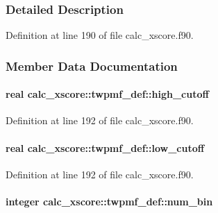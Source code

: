 \subsubsection{Detailed Description}


Definition at line 190 of file calc\-\_\-xscore.\-f90.



\subsubsection{Member Data Documentation}
\hypertarget{structcalc__xscore_1_1twpmf__def_afb807b7e8f286df937964bb273a77f7e}{
\paragraph[{high\-\_\-cutoff}]{\setlength{\rightskip}{0pt plus 5cm}real calc\-\_\-xscore\-::twpmf\-\_\-def\-::high\-\_\-cutoff}}\label{structcalc__xscore_1_1twpmf__def_afb807b7e8f286df937964bb273a77f7e}


Definition at line 192 of file calc\-\_\-xscore.\-f90.

\hypertarget{structcalc__xscore_1_1twpmf__def_ab755f519cb9d26f7707eb13ac4f07821}{
\paragraph[{low\-\_\-cutoff}]{\setlength{\rightskip}{0pt plus 5cm}real calc\-\_\-xscore\-::twpmf\-\_\-def\-::low\-\_\-cutoff}}\label{structcalc__xscore_1_1twpmf__def_ab755f519cb9d26f7707eb13ac4f07821}


Definition at line 192 of file calc\-\_\-xscore.\-f90.

\hypertarget{structcalc__xscore_1_1twpmf__def_a1289d957f5bb72b7d3cb255539fac6cf}{
\paragraph[{num\-\_\-bin}]{\setlength{\rightskip}{0pt plus 5cm}integer calc\-\_\-xscore\-::twpmf\-\_\-def\-::num\-\_\-bin}}\label{structcalc__xscore_1_1twpmf__def_a1289d957f5bb72b7d3cb255539fac6cf}


